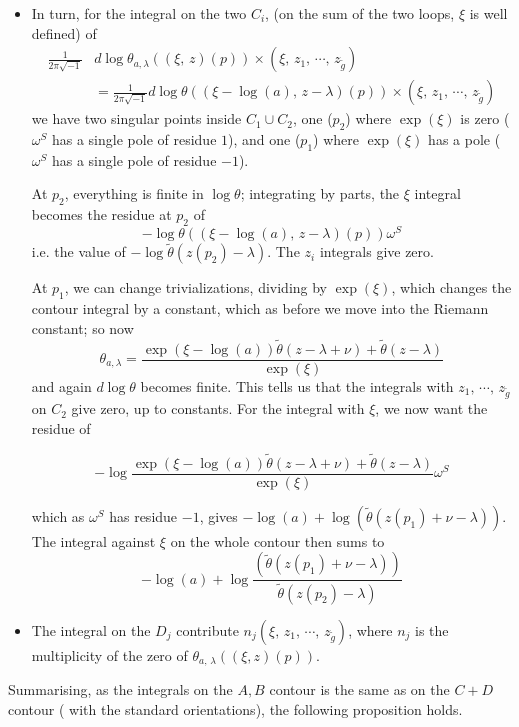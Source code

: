 \documentclass[12pt,reqno]{amsart}
\numberwithin{equation}{section}
\theoremstyle{definition}
\theoremstyle{remark}
\begin{document}
\begin{itemize}
\item  In turn, for  the integral on the two $C_i$, (on the sum of the two loops, $\xi$ is well defined)
of 
\begin{align*}\frac{1}{2\pi\sqrt{-1}}&d   \log \theta_{a,\lambda}((\xi,\, z)(p))\times (\xi,\, z_1,\,\cdots ,\,
z_{\widetilde g}) \\ &=\frac{1}{2\pi\sqrt{-1}}d   \log \theta ((\xi-\log(a),\, z-\lambda)(p))\times (\xi,\, z_1,\,\cdots ,\,
z_{\widetilde g})  \end{align*}
we have two singular points inside $C_1\cup C_2$, one ($p_2$) where $\exp(\xi) $ is zero ($\omega^S$ has
a single pole of residue $1$), and one ($p_1$) where $\exp(\xi) $ has a pole ($\omega^S$ has a single pole of residue $-1$).

At $p_2$, everything is finite in $  \log \theta$; integrating by parts, the $\xi$ integral  becomes the residue at $p_2$ of
$$-\log \theta ((\xi-\log(a),\, z-\lambda)(p))\omega^S$$ 
i.e. the value of $-\log \widetilde{\theta} (z(p_2)-\lambda )$. The $z_i$ integrals give zero.

At $p_1$, we can change trivializations, dividing by $\exp(\xi)$, which changes the contour integral by a constant, which as before we move into the Riemann constant; so now 
$$\theta_{a,\lambda} = \frac{\exp ({\xi -\log(a)})\widetilde{\theta}(z-\lambda+\nu)+
\widetilde{\theta} (z-\lambda )}{\exp(\xi)}$$
and again $d   \log \theta$ becomes finite. This tells us that the integrals with $z_1,\,\cdots ,\,
z_{\widetilde g}$ on  $C_2$ give zero, up to constants. For the integral with $\xi$, we now want the residue of 

$$- \log \frac{\exp ({\xi -\log(a)})\widetilde{\theta}(z-\lambda+\nu)+
\widetilde{\theta} (z-\lambda )}{\exp(\xi)}\omega^S$$ 

which as $\omega^S$ has residue $-1$, gives $- \log(a) +\log  (\widetilde{\theta}(z(p_1) +\nu -\lambda)) $.
The integral against $\xi$ on the whole contour then sums to 
$$- \log(a) +\log \frac{ (\widetilde{\theta}(z(p_1) +\nu -\lambda))}{\widetilde{\theta} (z(p_2)-\lambda )} $$

\item The integral on the $D_j$ contribute $  n_j (\xi,\, z_1,\,\cdots ,\,z_{\widetilde g})$, where
$n_j$ is the multiplicity of the zero of $\theta_{a,\,\lambda}((\xi,z)(p))$.\\
\end{itemize}
 
Summarising, as the integrals on the $A,B$ contour is  the same as on the $C +D$ contour ( with the standard orientations), the following proposition holds.
\end{document}
